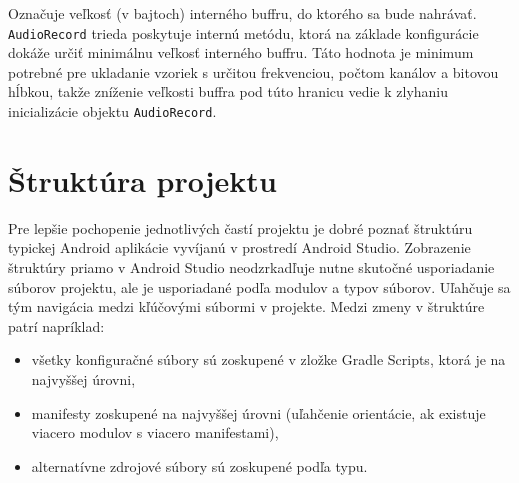 Označuje veľkosť (v bajtoch) interného buffru, do ktorého sa bude nahrávať. \texttt{AudioRecord} trieda poskytuje internú metódu, ktorá na základe konfigurácie dokáže určiť minimálnu veľkosť interného buffru. Táto hodnota je minimum potrebné pre ukladanie vzoriek s určitou frekvenciou, počtom kanálov a bitovou hĺbkou, takže zníženie veľkosti buffra pod túto hranicu vedie k zlyhaniu inicializácie objektu \texttt{AudioRecord}.

\section{Štruktúra projektu}
\label{android_structure}

Pre lepšie pochopenie jednotlivých častí projektu je dobré poznať štruktúru typickej Android aplikácie vyvíjanú v prostredí Android Studio. Zobrazenie štruktúry priamo v Android Studio neodzrkadľuje nutne skutočné usporiadanie súborov projektu, ale je usporiadané podľa modulov a typov súborov. Uľahčuje sa tým navigácia medzi kľúčovými súbormi v projekte. Medzi zmeny v štruktúre patrí napríklad:
\begin{itemize}
\item{všetky konfiguračné súbory sú zoskupené v zložke Gradle Scripts, ktorá je na najvyššej úrovni,}
\item{manifesty zoskupené na najvyššej úrovni (uľahčenie orientácie, ak existuje viacero modulov s viacero manifestami),}
\item{alternatívne zdrojové súbory sú zoskupené podľa typu.}
\end{itemize}



